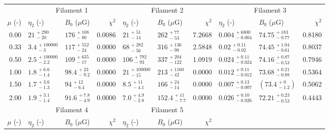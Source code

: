 \begin{tabular}{@{}rllr llr llr @{}}

\toprule
{} & \multicolumn{3}{c}{Filament 1} & \multicolumn{3}{c}{Filament 2} &
     \multicolumn{3}{c}{Filament 3} \\
\cmidrule(lr){2-4}
\cmidrule(lr){5-7}
\cmidrule(lr){8-10}
$\mu$ (-) & $\eta_2$ (-) & $B_0$ ($\mu$G) & $\chi^2$
          & $\eta_2$ (-) & $B_0$ ($\mu$G) & $\chi^2$
          & $\eta_2$ (-) & $B_0$ ($\mu$G) & $\chi^2$ \\

\midrule
0.00 & ${21}^{\,+290}_{\,-20}$ & ${176}^{\,+108}_{\,-80}$ & 0.0086
     & ${21}^{\,+51}_{\,-14}$ & ${262}^{\,+77}_{\,-53}$ & 7.2668
     & ${0.004}^{\,+6800}_{\,-0.004}$ & ${74.75}^{\,+183}_{\,-0.77}$ & 0.8180\\[1.5pt]
0.33 & ${3.4}^{\,+100000}_{\,-3}$ & ${117}^{\,+552}_{\,-24}$ & 0.0000
     & ${68}^{\,+282}_{\,-56}$ & ${316}^{\,+136}_{\,-98}$ & 2.5848
     & ${0.02}^{\,+0.11}_{\,-0.02}$ & ${74.45}^{\,+1.04}_{\,-0.61}$ & 0.8037\\[1.5pt]
0.50 & ${2.5}^{\,+100000}_{\,-2.2}$ & ${109}^{\,+635}_{\,-17}$ & 0.0000
     & ${106}^{\,+792}_{\,-93}$ & ${337}^{\,+204}_{\,-122}$ & 1.0919
     & ${0.024}^{\,+0.11}_{\,-0.024}$ & ${74.16}^{\,+0.87}_{\,-0.53}$ & 0.7946\\[1.5pt]
1.00 & ${1.8}^{\,+6.6}_{\,-1.4}$ & ${98.4}^{\,+23}_{\,-9.2}$ & 0.0000
     & ${21}^{\,+100000}_{\,-15}$ & ${213}^{\,+1160}_{\,-42}$ & 0.0000
     & ${0.012}^{\,+0.11}_{\,-0.012}$ & ${73.68}^{\,+0.21}_{\,-0.88}$ & 0.5364\\[1.5pt]
1.50 & ${1.7}^{\,+3.6}_{\,-1.3}$ & ${94}^{\,+12}_{\,-6.4}$ & 0.0000
     & ${8.5}^{\,+11}_{\,-4.1}$ & ${166}^{\,+24}_{\,-14}$ & 0.0000
     & ${0.007}^{\,+0.13}_{\,-0.007}$ &
     $\left({73.4}^{\,+0}_{\,-1.2}\right)$\tablenotemark{a} & 0.5062\\[1.5pt]
2.00 & ${1.9}^{\,+3.1}_{\,-1.4}$ & ${91.6}^{\,+7.8}_{\,-4.9}$ & 0.0000
     & ${7.0}^{\,+4.9}_{\,-2.8}$ & ${152.4}^{\,+11}_{\,-7.7}$ & 0.0000
     & ${0.026}^{\,+0.10}_{\,-0.026}$ & ${72.21}^{\,+0.23}_{\,-0.53}$ & 0.4443\\

\midrule
{} & \multicolumn{3}{c}{Filament 4} & \multicolumn{3}{c}{Filament 5} \\
\cmidrule(lr){2-4}
\cmidrule(lr){5-7}
$\mu$ (-) & $\eta_2$ (-) & $B_0$ ($\mu$G) & $\chi^2$
          & $\eta_2$ (-) & $B_0$ ($\mu$G) & $\chi^2$ \\


\end{tabular}
